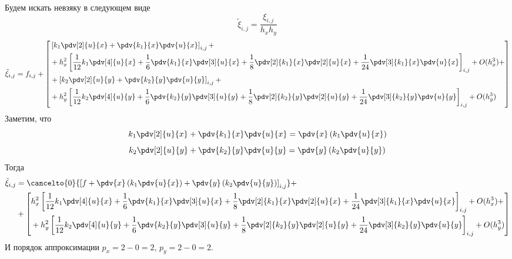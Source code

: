 Будем искать невзяку в следующем виде
\[
    \tilde{\xi}_{i,j} = \frac{\xi_{i,j}}{h_x h_y}
\]
\[
    \tilde{\xi}_{i,j} = f_{i,j} +
    \left[
    \begin{aligned}
        & \left[ k_1 \pdv[2]{u}{x} + \pdv{k_1}{x} \pdv{u}{x} \right]_{i,j} + \\
        & + h_x^2 \left[ \frac{1}{12} k_1 \pdv[4]{u}{x} + \frac{1}{6} \pdv{k_1}{x} \pdv[3]{u}{x} + \frac{1}{8} \pdv[2]{k_1}{x} \pdv[2]{u}{x} + \frac{1}{24} \pdv[3]{k_1}{x} \pdv{u}{x} \right]_{i,j} + O(h_x^3) + \\
        & + \left[ k_2 \pdv[2]{u}{y} + \pdv{k_2}{y} \pdv{u}{y} \right]_{i,j} + \\
        & + h_y^2 \left[ \frac{1}{12} k_2 \pdv[4]{u}{y} + \frac{1}{6} \pdv{k_2}{y} \pdv[3]{u}{y} + \frac{1}{8} \pdv[2]{k_2}{y} \pdv[2]{u}{y} + \frac{1}{24} \pdv[3]{k_2}{y} \pdv{u}{y} \right]_{i,j} + O(h_y^3)
    \end{aligned}
    \right]
\]
Заметим, что
\[ k_1 \pdv[2]{u}{x} + \pdv{k_1}{x} \pdv{u}{x} = \pdv{x} \left( k_1 \pdv{u}{x} \right) \]
\[ k_2 \pdv[2]{u}{y} + \pdv{k_2}{y} \pdv{u}{y} = \pdv{y} \left( k_2 \pdv{u}{y} \right) \]
Тогда
\[
    \begin{split}
        \tilde{\xi}_{i,j} &= \cancelto{0}{\left[ f + \pdv{x} \left( k_1 \pdv{u}{x} \right) + \pdv{y} \left( k_2 \pdv{u}{y} \right) \right]_{i,j}} + \\
        &+ \left[
        \begin{aligned}
            & h_x^2 \left[ \frac{1}{12} k_1 \pdv[4]{u}{x} + \frac{1}{6} \pdv{k_1}{x} \pdv[3]{u}{x} + \frac{1}{8} \pdv[2]{k_1}{x} \pdv[2]{u}{x} + \frac{1}{24} \pdv[3]{k_1}{x} \pdv{u}{x} \right]_{i,j} + O(h_x^3) + \\
            & + h_y^2 \left[ \frac{1}{12} k_2 \pdv[4]{u}{y} + \frac{1}{6} \pdv{k_2}{y} \pdv[3]{u}{y} + \frac{1}{8} \pdv[2]{k_2}{y} \pdv[2]{u}{y} + \frac{1}{24} \pdv[3]{k_2}{y} \pdv{u}{y} \right]_{i,j} + O(h_y^3)
        \end{aligned}
        \right]
    \end{split}
\]
И порядок аппроксимации $p_x = 2 - 0 = 2$, $p_y = 2 - 0 = 2$.

